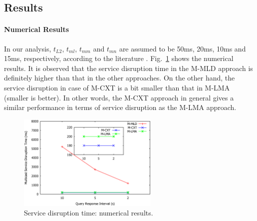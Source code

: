 \subsection{Results}
\paragraph{Numerical Results} In our analysis, $t_{L2}$, $t_{ml}$, $t_{mm}$ and $t_{mn}$ are assumed to be 50ms, 20ms, 10ms and 15ms, respectively, according to the literature \cite{d4.4}. Fig.~\ref{fig:c6_numerical_result} shows the numerical results. It is observed that the service disruption time in the M-MLD approach is definitely higher than that in the other approaches. On the other hand, the service disruption in case of M-CXT is a bit smaller than that in M-LMA (smaller is better). In other words, the M-CXT approach in general gives a similar performance in terms of service disruption as the M-LMA approach.
\begin{figure}[h!] 
 \begin{center} 
 \includegraphics[width=0.60\textwidth]{./Part2/Chapter4/figures/c6_numerical_result.eps} 
    \caption[The multicast service disruption time: numerical results.]{Service disruption time: numerical results.}
     \label{fig:c6_numerical_result}
  \end{center} 
\end{figure}

